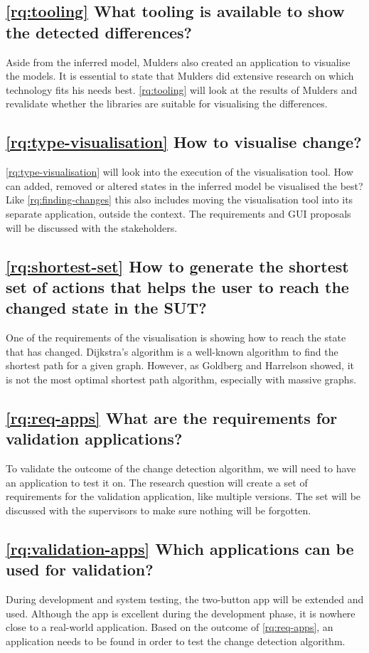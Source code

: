 \subsection{\ref{rq:tooling} What tooling is available to show the detected differences?}
Aside from the inferred model, Mulders also created an application to visualise the models. It is essential to state that Mulders did extensive research on which technology fits his needs best. \ref{rq:tooling} will look at the results of Mulders and revalidate whether the libraries are suitable for visualising the differences. 

\subsection{\ref{rq:type-visualisation} How to visualise change?}
\ref{rq:type-visualisation} will look into the execution of the visualisation tool. How can added, removed or altered states in the inferred model be visualised the best? Like \ref{rq:finding-changes} this also includes moving the visualisation tool into its separate application, outside the \testar context. The requirements and GUI proposals will be discussed with the \testar stakeholders. 

\subsection{\ref{rq:shortest-set} How to generate the shortest set of actions that helps the user to reach the changed state in the SUT?}
One of the requirements of the visualisation is showing how to reach the state that has changed. Dijkstra's algorithm \cite{dijkstra1959note} is a well-known algorithm to find the shortest path for a given graph. However, as Goldberg and Harrelson \cite{goldberg2005computing} showed, it is not the most optimal shortest path algorithm, especially with massive graphs. 

\subsection{\ref{rq:req-apps} What are the requirements for validation applications?}
To validate the outcome of the change detection algorithm, we will need to have an application to test it on. The research question will create a set of requirements for the validation application, like multiple versions. The set will be discussed with the supervisors to make sure nothing will be forgotten.

\subsection{\ref{rq:validation-apps} Which applications can be used for validation?}
During development and system testing, the two-button app will be extended and used. Although the app is excellent during the development phase, it is nowhere close to a real-world application. Based on the outcome of \ref{rq:req-apps}, an application needs to be found in order to test the change detection algorithm.

